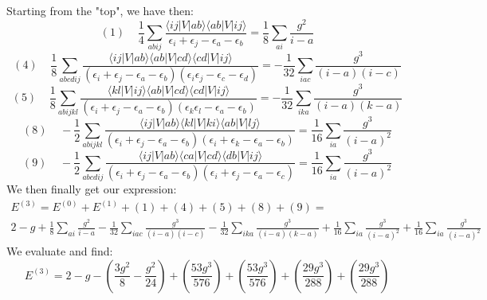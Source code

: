\documentclass{article}
\begin{document}
Starting from the "top", we have then:
\begin{equation}
    (1) \; \; \; \; \frac{1}{4} \sum_{abij} \frac{\langle ij | V | ab\rangle \langle ab | V | ij \rangle}{\epsilon_i + \epsilon_j - \epsilon_a - \epsilon_b} = \frac{1}{8} \sum_{ai} \frac{g^2}{i-a}
\end{equation}
\begin{equation}
    (4) \; \; \; \; \frac{1}{8} \sum_{abcdij} \frac{\langle ij | V | ab \rangle \langle ab | V | cd \rangle \langle cd | V | ij \rangle}{(\epsilon_i + \epsilon_j - \epsilon_a - \epsilon_b)(\epsilon_i \epsilon_j - \epsilon_c - \epsilon_d)} = -\frac{1}{32} \sum_{iac} \frac{g^3}{(i-a)(i-c)}
\end{equation}
\begin{equation}
    (5) \; \; \; \; \frac{1}{8} \sum_{abijkl} \frac{\langle kl | V | ij \rangle \langle ab | V | cd \rangle \langle cd | V | ij \rangle}{(\epsilon_i + \epsilon_j - \epsilon_a - \epsilon_b)(\epsilon_k \epsilon_l - \epsilon_a - \epsilon_b)} = -\frac{1}{32} \sum_{ika} \frac{g^3}{(i-a)(k-a)}
\end{equation}
\begin{equation}
    (8) \; \; \; \; -\frac{1}{2} \sum_{abijkl} \frac{\langle ij | V | ab \rangle \langle kl | V | ki \rangle \langle ab | V | lj \rangle}{(\epsilon_i + \epsilon_j - \epsilon_a - \epsilon_b)(\epsilon_i + \epsilon_k - \epsilon_a - \epsilon_b)} = \frac{1}{16} \sum_{ia} \frac{g^3}{(i-a)^2}
\end{equation}
\begin{equation}
    (9) \; \; \; \; -\frac{1}{2} \sum_{abcdij} \frac{\langle ij | V | ab \rangle \langle ca | V | cd \rangle \langle db | V | ij \rangle}{(\epsilon_i + \epsilon_j - \epsilon_a - \epsilon_b)(\epsilon_i + \epsilon_j - \epsilon_a - \epsilon_c)} = \frac{1}{16} \sum_{ia} \frac{g^3}{(i-a)^2}
\end{equation}
We then finally get our expression:
\begin{gather*}
    E^{(3)} = E^{(0)} + E^{(1)} + (1) + (4) + (5) + (8) + (9) = \\ 2 - g + \frac{1}{8} \sum_{ai} \frac{g^2}{i-a} - \frac{1}{32} \sum_{iac} \frac{g^3}{(i-a)(i-c)} -\frac{1}{32} \sum_{ika} \frac{g^3}{(i-a)(k-a)} + \frac{1}{16} \sum_{ia} \frac{g^3}{(i-a)^2} + \frac{1}{16} \sum_{ia} \frac{g^3}{(i-a)^2}
\end{gather*}
We evaluate and find:
\begin{equation*}
    E^{(3)} = 2 - g - \left(\frac{3g^2}{8} - \frac{g^2}{24} \right) + \left(\frac{53g^3}{576}\right) + \left(\frac{53g^3}{576}\right) + \left(\frac{29g^3}{288}\right) + \left(\frac{29g^3}{288}\right)
\end{equation*}
\end{document}
